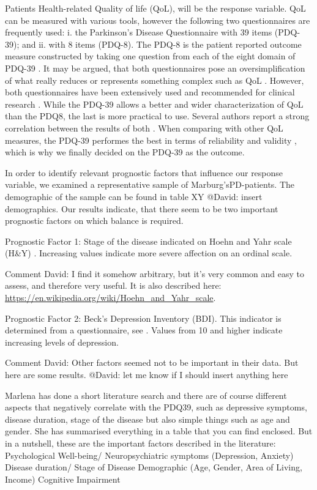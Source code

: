 \documentclass[number,12pt,review]{elsarticle}
\begin{document}
\label{varsec}

Patients Health-related Quality of life (QoL), will be the response variable. QoL can be measured with various tools, however the following two questionnaires are frequently used: i. the Parkinson's Disease Questionnaire with 39 items (PDQ-39); and ii. with 8 items (PDQ-8). 
The PDQ-8 \citep{peto1998pdq} is the patient reported outcome measure constructed by taking one question from each of the eight domain of PDQ-39 \citep{jenkinson1997parkinson}. It may be argued, that both questionnaires pose an oversimplification of what really reduces or represents something complex such as QoL \citep{martinez1998introduction}. However, both questionnaires have been extensively used and recommended for clinical research \citep{marinus2002health}. While the PDQ-39 allows a better and wider characterization of QoL than the PDQ8, the last is more practical to use. Several authors report a strong correlation between the results of both \citet{chen2017evaluation}. When comparing with other QoL measures, the PDQ-39 performes the best in terms of reliability and validity \citep{marinus2002health}, which is why we finally decided on the PDQ-39 as the outcome.

In order to identify relevant prognostic factors that influence our response variable, we examined a representative sample of Marburg's\ac{PD}-patients. The demographic of the sample can be found in table XY \ac{@David: insert demographics}. Our results indicate, that there seem to be two important prognostic factors on which balance is required.

Prognostic Factor 1: Stage of the disease indicated on Hoehn and Yahr scale (H\&Y) \citep{hoehn1998parkinsonism}. Increasing values indicate more severe affection on an ordinal scale. 

	Comment David: I find it somehow arbitrary, but it's very common and easy to assess, and therefore very useful. It is also described here: \url{https://en.wikipedia.org/wiki/Hoehn\_and\_Yahr\_scale}.

Prognostic Factor 2: Beck's Depression Inventory (BDI). This indicator is determined from a questionnaire, see \citet{beck1988bhs}. Values from 10 and higher indicate increasing levels of depression.

Comment David: Other factors seemed not to be important in their data. But here are some results. 
	\ac{@David: let me know if I should insert anything here}
	
	Marlena has done a short literature search and there are of course different aspects that negatively correlate
	with the PDQ39, such as depressive symptoms, disease duration, stage of the disease but also simple things such as age and gender.
	She has summarised everything in a table that you can find enclosed. But in a nutshell, these are the important factors described in the literature:
	Psychological Well-being/ Neuropsychiatric symptoms (Depression, Anxiety)
	Disease duration/ Stage of Disease
	Demographic (Age, Gender, Area of Living, Income)
	Cognitive Impairment
\end{document}
